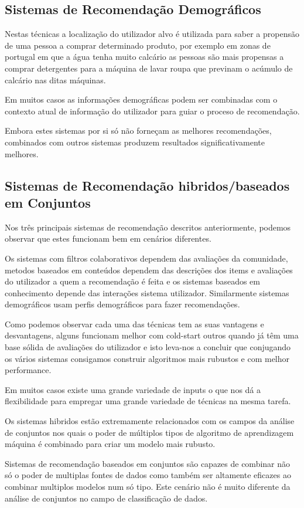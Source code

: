 \hfill
\subsection{Sistemas de Recomendação Demográficos}
\hfill
 \par Nestas técnicas a localização do utilizador alvo é utilizada para saber a propensão de uma pessoa a comprar determinado produto, por exemplo em zonas de portugal em que a água tenha muito calcário as pessoas são mais propensas a comprar detergentes para a máquina de lavar roupa que previnam o acúmulo de calcário nas ditas máquinas.
 \par Em muitos casos as informações demográficas podem ser combinadas com o contexto atual de informação do utilizador para guiar o proceso de recomendação.
 \par Embora estes sistemas por si só não forneçam as melhores recomendações, combinados com outros sistemas produzem resultados significativamente melhores.
\hfill
\subsection{Sistemas de Recomendação hibridos/baseados em Conjuntos}
\hfill
 \par Nos três principais sistemas de recomendação descritos anteriormente, podemos observar que estes funcionam bem em cenários diferentes. 
 \par Os sistemas com filtros colaborativos dependem das avaliações da comunidade, metodos baseados em conteúdos dependem das descrições dos items e avaliações do utilizador a quem a recomendação é feita e os sistemas baseados em conhecimento depende das interações sistema utilizador. Similarmente sistemas demográficos usam perfis demográficos para fazer recomendações.
 \par Como podemos observar cada uma das técnicas tem as suas vantagens e desvantagens, alguns funcionam melhor com cold-start outros quando já têm uma base sólida de avaliações do utilizador e isto leva-nos a concluir que conjugando os vários sistemas consigamos construir algoritmos mais rubustos e com melhor performance.
 \par Em muitos casos existe uma grande variedade de inputs o que nos dá a flexibilidade para empregar uma grande variedade de técnicas na mesma tarefa.
 \par Os sistemas hibridos estão extremamente relacionados com os campos da análise de conjuntos nos quais o poder de múltiplos tipos de algoritmo de aprendizagem máquina é combinado para criar um modelo mais rubusto.
 \par Sistemas de recomendação baseados em conjuntos são capazes de combinar não só o poder de multiplas fontes de dados como também ser altamente eficazes ao combinar multiplos modelos num só tipo. Este cenário não é muito diferente da análise de conjuntos no campo de classificação de dados.

